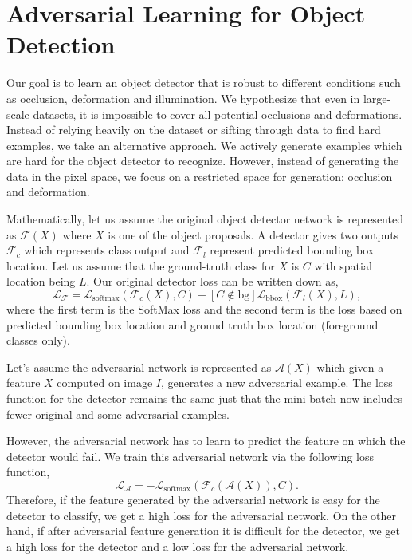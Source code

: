 \documentclass[10pt,twocolumn,letterpaper]{article}
\begin{document}
\section{Adversarial Learning for Object Detection}
Our goal is to learn an object detector that is robust to different conditions such as occlusion, deformation and illumination. We hypothesize that even in large-scale datasets, it is impossible to cover all potential occlusions and deformations. Instead of relying heavily on the dataset or sifting through data to find hard examples, we take an alternative approach. We actively generate examples which are hard for the object detector to recognize. However, instead of generating the data in the pixel space, we focus on a restricted space for generation: occlusion and deformation.

Mathematically, let us assume the original object detector network is represented as $\mathcal{F}(X)$ where $X$ is one of the object proposals. A detector gives two outputs $\mathcal{F}_c$ which represents class output and $\mathcal{F}_l$ represent predicted bounding box location. Let us assume that the ground-truth class for $X$ is $C$ with spatial location being $L$. Our original detector loss can be written down as, 
{\small
\begin{equation}
    \nonumber
    \mathcal{L}_\mathcal{F} = \mathcal{L}_{\text{softmax}}(\mathcal{F}_c(X), C) + \left[C \notin \text{bg}\right] \mathcal{L}_{\text{bbox}}(\mathcal{F}_l(X), L), 
\end{equation}
}
where the first term is the SoftMax loss and the second term is the loss based on predicted bounding box location and ground truth box location (foreground classes only). 

Let's assume the adversarial network is represented as $\mathcal{A}(X)$ which given a feature $X$ computed on image $I$, generates a new adversarial example. The loss function for the detector remains the same just that the mini-batch now includes fewer original and some adversarial examples. 

However, the adversarial network has to learn to predict the feature on which the detector would fail. We train this adversarial network via the following loss function,
{\small
\begin{equation}
    \nonumber
    \mathcal{L}_\mathcal{A} = - \mathcal{L}_{\text{softmax}}(\mathcal{F}_c(\mathcal{A}(X)), C).
\end{equation}
}
Therefore, if the feature generated by the adversarial network is easy for the detector to classify, we get a high loss for the adversarial network. On the other hand, if after adversarial feature generation it is difficult for the detector, we get a high loss for the detector and a low loss for the adversarial network.
\end{document}
